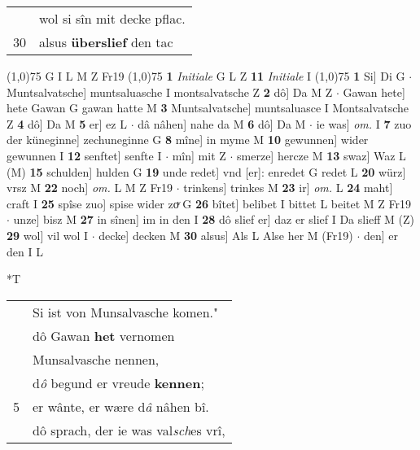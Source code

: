 \documentclass[8pt,a4paper,notitlepage]{article}
\begin{document}
\begin{table}[ht]
\begin{minipage}[t]{0.5\linewidth}
\begin{tabular}{rl}
 & wol si sîn mit decke pflac.\\ 
30 & alsus \textbf{überslief} den tac\\ 
\end{tabular}
\scriptsize
\line(1,0){75} \newline
G I L M Z Fr19 \newline
\line(1,0){75} \newline
\textbf{1} \textit{Initiale} G L Z  \textbf{11} \textit{Initiale} I  \newline
\line(1,0){75} \newline
\textbf{1} Si] Di G  $\cdot$ Muntsalvatsche] muntsaluasche I montsalvatsche Z \textbf{2} dô] Da M Z  $\cdot$ Gawan hete] hete Gawan G gawan hatte M \textbf{3} Muntsalvatsche] muntsaluasce I Montsalvatsche Z \textbf{4} dô] Da M \textbf{5} er] ez L  $\cdot$ dâ nâhen] nahe da M \textbf{6} dô] Da M  $\cdot$ ie was] \textit{om.} I \textbf{7} zuo der küneginne] zechuneginne G \textbf{8} mîne] in myme M \textbf{10} gewunnen] wider gewunnen I \textbf{12} senftet] senfte I  $\cdot$ mîn] mit Z  $\cdot$ smerze] hercze M \textbf{13} swaz] Waz L (M) \textbf{15} schulden] hulden G \textbf{19} unde redet] vnd [er]: enredet G redet L \textbf{20} würz] vrsz M \textbf{22} noch] \textit{om.} L M Z Fr19  $\cdot$ trinkens] trinkes M \textbf{23} ir] \textit{om.} L \textbf{24} maht] craft I \textbf{25} spîse zuo] spise wider zoͮ G \textbf{26} bîtet] belibet I bittet L beitet M Z Fr19  $\cdot$ unze] bisz M \textbf{27} in sînen] im in den I \textbf{28} dô slief er] daz er slief I Da slieff M (Z) \textbf{29} wol] vil wol I  $\cdot$ decke] decken M \textbf{30} alsus] Als L Alse her M (Fr19)  $\cdot$ den] er den I L \newline
\end{minipage}
\hspace{0.5cm}
\begin{minipage}[t]{0.5\linewidth}
\small
\begin{center}*T
\end{center}
\begin{tabular}{rl}
 & Si ist von Munsalvasche komen."\\ 
 & dô Gawan \textbf{het} vernomen\\ 
 & Munsalvasche nennen,\\ 
 & d\textit{ô} begund er vreude \textbf{kennen};\\ 
5 & er wânte, er wære d\textit{â} nâhen bî.\\ 
 & dô sprach, der ie was val\textit{sch}es vrî,\\ 

\end{tabular}
\end{minipage}
\end{table}
\end{document}
